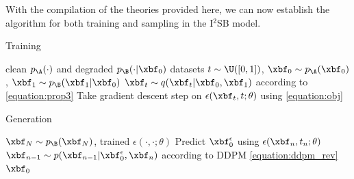 With the compilation of the theories provided here, we can now establish the algorithm for both training and sampling in the I$^2$SB model.

\begin{algorithm}[H]
  \caption{Training}
  \label{algorithm:train}
  \begin{algorithmic}[1]
     clean $p_\A(\cdot)$ and degraded $p_\B(\cdot|\xbf_0)$ datasets
    \REPEAT
    \STATE $t\sim\U([0,1])$, $\xbf_0 \sim p_\A(\xbf_0)$, $\xbf_1 \sim p_\B(\xbf_1|\xbf_0)$
    \STATE $\xbf_t \sim q(\xbf_t|\xbf_0,\xbf_1)$ according to \eqref{equation:prop3}
    \STATE Take gradient descent step on $\epsilon(\xbf_t,t;\theta)$ using \eqref{equation:obj}
  \end{algorithmic}
\end{algorithm}

\begin{algorithm}[H]
  \caption{Generation}
  \label{algorithm:sample}
  \begin{algorithmic}[1]
     $\xbf_N \sim p_\B(\xbf_N)$, trained $\epsilon(\cdot,\cdot; \theta)$
    \STATE Predict $\xbf_0^\epsilon$ using $\epsilon(\xbf_n, t_n; \theta)$
    \STATE $\xbf_{n-1} \sim p(\xbf_{n-1} | \xbf_0^\epsilon, \xbf_n)$ according to DDPM \eqref{equation:ddpm_rev}
    \ENDFOR
     $\xbf_0$
  \end{algorithmic}
\end{algorithm}
